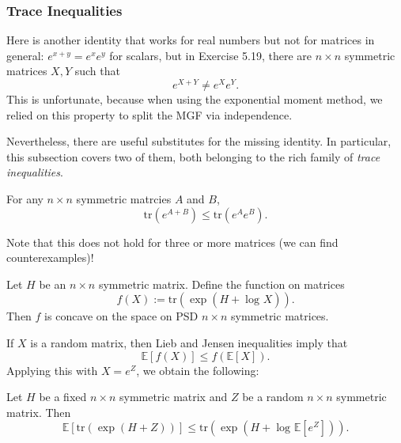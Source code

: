 \subsubsection{Trace Inequalities}
Here is another identity that works for real numbers but not for matrices in general: $e^{x + y} = e^x e^y$ for 
scalars, but in Exercise 5.19, there are $n \times n$ symmetric matrices $X, Y$ such that 
\[ e^{X + Y} \neq e^X e^Y. \]
This is unfortunate, because when using the exponential moment method, we relied on this property to split 
the MGF via independence. 

Nevertheless, there are useful substitutes for the missing identity. In particular, this subsection covers two 
of them, both belonging to the rich family of \textit{trace inequalities}.

\begin{theorem}
\label{thm:5.4.7}
For any $n \times n$ symmetric matrcies $A$ and $B$, 
\[ \mathrm{tr}(e^{A + B}) \leq \mathrm{tr}(e^A e^B). \]
\end{theorem}
Note that this does not hold for three or more matrices (we can find counterexamples)!

\begin{theorem}
\label{thm:5.4.8}
Let $H$ be an $n \times n$ symmetric matrix. Define the function on matrices 
\[ f(X) := \mathrm{tr}(\exp{(H + \log_{}{X})}). \]
Then $f$ is concave on the space on PSD $n \times n$ symmetric matrices.
\end{theorem}

If $X$ is a random matrix, then Lieb and Jensen inequalities imply that 
\[ \mathbb{E}[f(X)] \leq f(\mathbb{E}[X]). \]
Applying this with $X = e^Z$, we obtain the following:

\begin{lemma}
\label{lem:5.4.9}
Let $H$ be a fixed $n \times n$ symmetric matrix and $Z$ be a random $n \times n$ symmetric matrix. Then 
\[ \mathbb{E}[\mathrm{tr}(\exp{(H + Z)})] \leq \mathrm{tr}(\exp{(H + \log_{}{\mathbb{E}[e^Z]})}). \]
\end{lemma}


